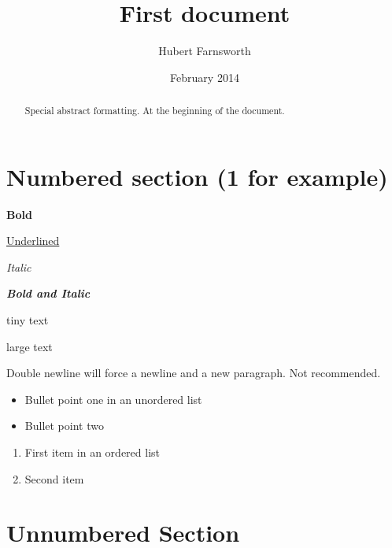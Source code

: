 \documentclass[12pt, a4paper]{article} %
\title{First document}
\author{Hubert Farnsworth}
\date{February 2014} %
\begin{document}

\maketitle %

\tableofcontents %



\begin{abstract}
Special abstract formatting. At the beginning of the document.
\end{abstract}



\section{Numbered section (1 for example)}

\textbf{Bold}

\underline{Underlined} 

\textit{Italic}

\textbf{\textit{Bold and Italic}}

{\tiny tiny text}

{\LARGE large text}



Double newline will force a newline and a new paragraph. Not recommended.



\begin{itemize}
  \item Bullet point one in an unordered list
  \item Bullet point two
\end{itemize}

\begin{enumerate}
  \item First item in an ordered list
  \item Second item
\end{enumerate}



\section*{Unnumbered Section} %
\end{document}
